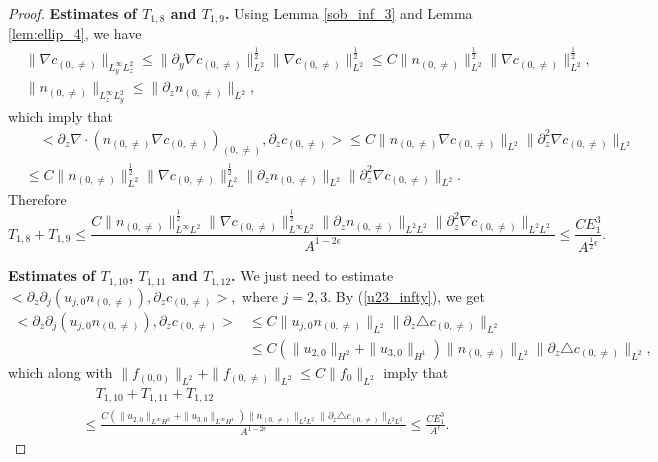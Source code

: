 \documentclass[12pt, reqno]{amsart}
\numberwithin{equation}{section}
\begin{document}
\begin{proof}
		
		{\bf  Estimates of $T_{1,8}$ and $T_{1,9}$.}
		Using Lemma \ref{sob_inf_3} and Lemma \ref{lem:ellip_4},
		we have
		\begin{equation*}
			\begin{aligned}
				&\|\nabla c_{(0,\neq)}\|_{L^{\infty}_yL^2_z}
				\leq \|\partial_y\nabla c_{(0,\neq)}\|_{L^2}^{\frac12}
				\|\nabla c_{(0,\neq)}\|_{L^2}^{\frac12}
				\leq C\|n_{(0,\neq)}\|_{L^2}^{\frac12}
				\|\nabla c_{(0,\neq)}\|_{L^2}^{\frac12},\\
				&\|n_{(0,\neq)}\|_{L^{\infty}_zL^2_y}\leq 
				\|\partial_zn_{(0,\neq)}\|_{L^2},
			\end{aligned}
		\end{equation*}
		which imply that
		\begin{align*}
			&\quad <\partial_z\nabla\cdot(n_{(0,\neq)}\nabla c_{(0,\neq)})_{(0,\neq)},\partial_z
			c_{(0,\neq)}>\leq C
			\|n_{(0,\neq)}\nabla c_{(0,\neq)}\|_{L^2}
			\|\partial_z^2\nabla c_{(0,\neq)}\|_{L^2}\\
			&\leq C\|n_{(0,\neq)}\|_{L^2}^{\frac12}
			\|\nabla c_{(0,\neq)}\|_{L^2}^{\frac12}
			\|\partial_zn_{(0,\neq)}\|_{L^2}
			\|\partial_z^2\nabla c_{(0,\neq)}\|_{L^2}.
		\end{align*}
		Therefore
		\begin{equation*}
			T_{1,8}+T_{1,9}\leq 
			\frac{C\|n_{(0,\neq)}\|_{L^{\infty}L^2}^{\frac12}
				\|\nabla c_{(0,\neq)}\|_{L^{\infty}L^2}^{\frac12}
				\|\partial_zn_{(0,\neq)}\|_{L^2L^2}
				\|\partial_z^2\nabla c_{(0,\neq)}\|_{L^2L^2}}{A^{1-2\epsilon}}
			\leq \frac{CE_1^3}{ A^{\frac{1}{2}\epsilon}}.
		\end{equation*}
		
		{\bf Estimates of $T_{1,10}$, $T_{1,11}$ and $T_{1,12}$.}
		We just need to estimate  $<\partial_z\partial_j (u_{j,0}n_{(0,\neq)}),
		\partial_zc_{(0,\neq)}>,$ where $j=2,3.$
		By (\ref{u23_infty}), we get
		\begin{equation*}
			\begin{aligned}
				<\partial_z\partial_j (u_{j,0}n_{(0,\neq)}),
				\partial_zc_{(0,\neq)}>
				&\leq
				C\|u_{j,0}n_{(0,\neq)}\|_{L^2}
				\|\partial_z\triangle c_{(0,\neq)}\|_{L^2}\\
				&\leq C(\|u_{2,0}\|_{H^2}+\|u_{3,0}\|_{H^1})
				\|n_{(0,\neq)}\|_{L^2}
				\|\partial_z\triangle c_{(0,\neq)}\|_{L^2},	
			\end{aligned}
		\end{equation*}
		which along with $\|f_{(0,0)}\|_{L^2}+
		\|f_{(0,\neq)}\|_{L^2}\leq C\|f_{0}\|_{L^2}$ imply that 
		\begin{equation*}
			\begin{aligned}
				&\quad T_{1,10}+T_{1,11}+T_{1,12}\\
				&\leq
				\frac{C(\|u_{2,0}\|_{L^{\infty}H^2}+\|u_{3,0}\|_{L^{\infty}H^1})
					\|n_{(0,\neq)}\|_{L^2L^2}
					\|\partial_z\triangle c_{(0,\neq)}\|_{L^2L^2}}{A^{1-2\epsilon}}
				\leq \frac{CE_1^3}{ A^{\epsilon}}.		
			\end{aligned}
		\end{equation*}
		

\end{proof}
\end{document}
